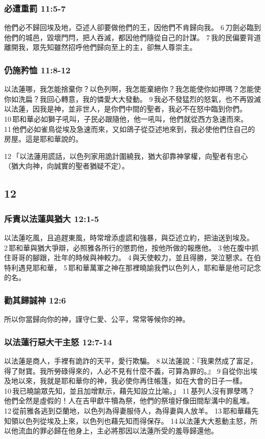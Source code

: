 \subsubsection{必遭重罰 11:5-7}
他們必不歸回埃及地，亞述人卻要做他們的王，因他們不肯歸向我。 6 刀劍必臨到他們的城邑，毀壞門閂，把人吞滅，都因他們隨從自己的計謀。 7 我的民偏要背道離開我，眾先知雖然招呼他們歸向至上的主，卻無人尊崇主。

\subsubsection{仍施矜恤 11:8-12}
以法蓮哪，我怎能捨棄你？以色列啊，我怎能棄絕你？我怎能使你如押瑪？怎能使你如洗扁？我回心轉意，我的憐愛大大發動。 9 我必不發猛烈的怒氣，也不再毀滅以法蓮，因我是神，並非世人，是你們中間的聖者，我必不在怒中臨到你們。 10 耶和華必如獅子吼叫，子民必跟隨他，他一吼叫，他們就從西方急速而來。 11 他們必如雀鳥從埃及急速而來，又如鴿子從亞述地來到，我必使他們住自己的房屋。這是耶和華說的。

12 「以法蓮用謊話，以色列家用詭計圍繞我，猶大卻靠神掌權，向聖者有忠心（猶大向神，向誠實的聖者猶疑不定）。


\subsection{ 12}
\subsubsection{斥責以法蓮與猶大 12:1-5}
以法蓮吃風，且追趕東風，時常增添虛謊和強暴，與亞述立約，把油送到埃及。 2 耶和華與猶大爭辯，必照雅各所行的懲罰他，按他所做的報應他。 3 他在腹中抓住哥哥的腳跟，壯年的時候與神較力。 4 與天使較力，並且得勝，哭泣懇求。在伯特利遇見耶和華， 5 耶和華萬軍之神在那裡曉諭我們以色列人，耶和華是他可記念的名。

\subsubsection{勸其歸誠神 12:6}
所以你當歸向你的神，謹守仁愛、公平，常常等候你的神。

\subsubsection{以法蓮行惡大干主怒 12:7-14}
以法蓮是商人，手裡有詭詐的天平，愛行欺騙。 8 以法蓮說：『我果然成了富足，得了財寶。我所勞碌得來的，人必不見有什麼不義，可算為罪的。』 9 自從你出埃及地以來，我就是耶和華你的神，我必使你再住帳篷，如在大會的日子一樣。 10 我已曉諭眾先知，並且加增默示，藉先知設立比喻。」 11 基列人沒有罪孽嗎？他們全然是虛假的！人在吉甲獻牛犢為祭，他們的祭壇好像田間犁溝中的亂堆。 12 從前雅各逃到亞蘭地，以色列為得妻服侍人，為得妻與人放羊。 13 耶和華藉先知領以色列從埃及上來，以色列也藉先知而得保存。 14 以法蓮大大惹動主怒，所以他流血的罪必歸在他身上，主必將那因以法蓮所受的羞辱歸還他。

